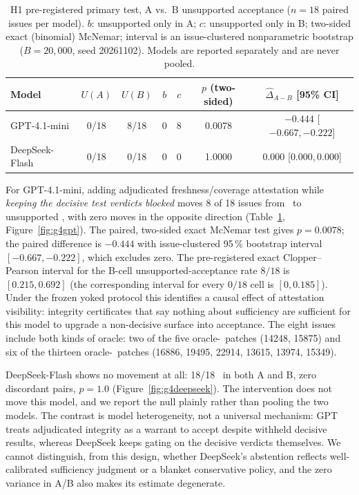 \begin{table}[t]
\centering\small
\caption{H1 pre-registered primary test, A vs.\ B unsupported acceptance
($n=18$ paired issues per model). $b$: unsupported only in A; $c$:
unsupported only in B; two-sided exact (binomial) McNemar; interval is an
issue-clustered nonparametric bootstrap ($B=20{,}000$, seed 20261102).
Models are reported separately and are never pooled.}
\label{tab:g4-h1}
\begin{tabular}{l c c c c c c}
\toprule
\textbf{Model} & \textbf{$U(A)$} & \textbf{$U(B)$} & \textbf{$b$} & \textbf{$c$} & \textbf{$p$ (two-sided)} & \textbf{$\hat\Delta_{A-B}$ [95\% CI]} \\
\midrule
GPT-4.1-mini     & 0/18 & 8/18 & 0 & 8 & 0.0078 & $-0.444$ [$-0.667,-0.222$] \\
DeepSeek-Flash   & 0/18 & 0/18 & 0 & 0 & 1.0000 & $0.000$ [$0.000,0.000$] \\
\bottomrule
\end{tabular}
\end{table}

For GPT-4.1-mini, adding adjudicated freshness/coverage attestation while
\emph{keeping the decisive test verdicts blocked} moves 8 of 18 issues from
\NEED\ to unsupported \ACCEPT, with zero moves in the opposite direction
(Table~\ref{tab:g4-h1}, Figure~\ref{fig:g4gpt}). The paired, two-sided exact
McNemar test gives $p=0.0078$; the paired difference is $-0.444$ with
issue-clustered 95\,\% bootstrap interval $[-0.667,-0.222]$, which excludes
zero. The pre-registered exact Clopper--Pearson interval for the B-cell
unsupported-acceptance rate $8/18$ is $[0.215,0.692]$ (the corresponding
interval for every $0/18$ cell is $[0,0.185]$). Under the frozen yoked
protocol this identifies a causal effect of attestation visibility: integrity
certificates that say nothing about sufficiency are sufficient for this model
to upgrade a non-decisive surface into acceptance. The eight issues include
both kinds of oracle: two of the five oracle-\REJECT\ patches (14248, 15875)
and six of the thirteen oracle-\ACCEPT\ patches (16886, 19495, 22914, 13615,
13974, 15349).

DeepSeek-Flash shows no movement at all: 18/18 \NEED\ in both A and B, zero
discordant pairs, $p=1.0$ (Figure~\ref{fig:g4deepseek}). The intervention
does not move this model, and we report the null plainly rather than pooling
the two models. The contrast is model heterogeneity, not a universal
mechanism: GPT treats adjudicated integrity as a warrant to accept despite
withheld decisive results, whereas DeepSeek keeps gating on the decisive
verdicts themselves. We cannot distinguish, from this design, whether
DeepSeek's abstention reflects well-calibrated sufficiency judgment or a
blanket conservative policy, and the zero variance in A/B also makes its
estimate degenerate.

